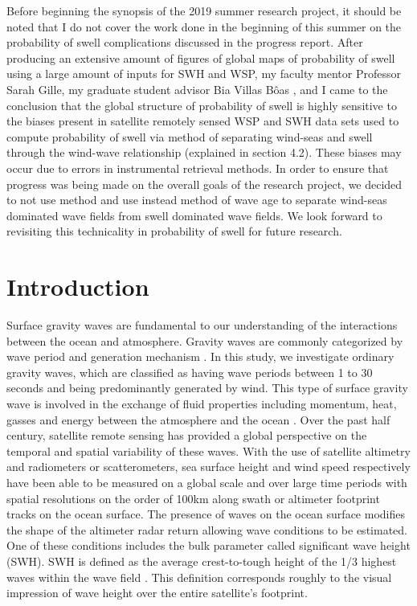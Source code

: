 \documentclass[12pt,twoside]{article}
\begin{document}
Before beginning the synopsis of the 2019 summer research project, it should be noted that I do not cover the work done in the beginning of this summer on the probability of swell complications discussed in the progress report. After producing an extensive amount of figures of global maps of probability of swell using a large amount of inputs for SWH and WSP, my faculty mentor Professor Sarah Gille, my graduate student advisor Bia Villas B\^oas , and I came to the conclusion that the global structure of probability of swell is highly sensitive to the biases present in satellite remotely sensed WSP and SWH data sets used to compute probability of swell via \citet{jiang2013global} method of separating wind-seas and swell through the wind-wave relationship (explained in section 4.2). These biases may occur due to errors in instrumental retrieval methods. In order to ensure that progress was being made on the overall goals of the research project, we decided to not use \citet{jiang2013global} method and use instead \citet{semedo2011global} method of wave age to separate wind-seas dominated wave fields from swell dominated wave fields. We look forward to revisiting this technicality in probability of swell for future research.

\section{Introduction}

Surface gravity waves are fundamental to our understanding of the interactions between the ocean and atmosphere. Gravity waves are commonly categorized by wave period and generation mechanism \cite{munk1951origin}. In this study, we investigate ordinary gravity waves, which are classified as having wave periods between 1 to 30 seconds and being predominantly generated by wind. This type of surface gravity wave is involved in the exchange of fluid properties including momentum, heat, gasses and energy between the atmosphere and the ocean \cite{cavaleri2012wind}. Over the past half century, satellite remote sensing has provided a global perspective on the temporal and spatial variability of these waves. With the use of satellite altimetry and radiometers or scatterometers, sea surface height and wind speed respectively have been able to be measured on a global scale and over large time periods with spatial resolutions on the order of 100km along swath or altimeter footprint tracks on the ocean surface. The presence of waves on the ocean surface modifies the shape of the altimeter radar return allowing wave conditions to be estimated. One of these conditions includes the bulk parameter called significant wave height (SWH). SWH is defined as the average crest-to-tough height of the 1/3 highest waves within the wave field \cite{ardhuin2015ocean}. This definition corresponds roughly to the visual impression of wave height \cite{ardhuin2015ocean} over the entire satellite's footprint. 
\end{document}
